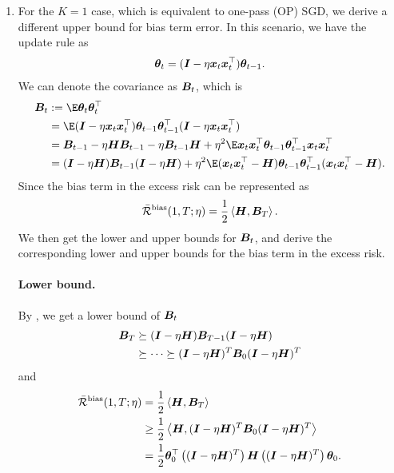 \begin{enumerate}[leftmargin=*]
    \item For the $K = 1$ case, which is equivalent to one-pass (OP) SGD, we derive a different upper bound for bias term error. In this scenario, we have the update rule as
        \begin{align*}
            {\bm{\theta}}_{t} = ({\bm{I}}-\eta{\bm{x}}_{t}{\bm{x}}_{t}^{\top}){\bm{\theta}}_{t-1}.
        \end{align*}
        We can denote the covariance as ${\bm{B}}_t$, which is
        \begin{align}
            \mB_t&:=\E\vtheta_{t}\vtheta_{t}^{\top} \notag\\
            &=\E(\mI-\eta\vx_{t}\vx_{t}^{\top})\vtheta_{t-1}\vtheta_{t-1}^{\top}(\mI-\eta\vx_{t}\vx_{t}^{\top}) \notag \\
            &=\mB_{t-1}-\eta\mH\mB_{t-1}-\eta\mB_{t-1}\mH+\eta^2\E\vx_{t}\vx_{t}^{\top}\vtheta_{t-1}\vtheta_{t-1}^{\top}\vx_{t}\vx_{t}^{\top} \notag \\
            &=(\mI-\eta\mH)\mB_{t-1}(\mI-\eta\mH)+\eta^2\E(\vx_{t}\vx_{t}^{\top}-\mH)\vtheta_{t-1}\vtheta_{t-1}^{\top}(\vx_{t}\vx_{t}^{\top}-\mH). \label{equ:recursion-B-t}
        \end{align}
        Since the bias term in the excess risk can be represented as
        \begin{align*}
            \bar{\mathcal{R}}^{\mathrm{bias}}(1,T;\eta)=\frac{1}{2}\left\langle {\bm{H}},{\bm{B}}_T\right\rangle.
        \end{align*}
        We then get the lower and upper bounds for ${\bm{B}}_t$, and derive the corresponding lower and upper bounds for the bias term in the excess risk.
        \paragraph{Lower bound.}
        
        By , we get a lower bound of ${\bm{B}}_t$
        \begin{align*}
            {\bm{B}}_T&\succeq({\bm{I}}-\eta{\bm{H}}){\bm{B}}_{T-1}({\bm{I}}-\eta{\bm{H}}) \\
            &\succeq \cdots \succeq({\bm{I}}-\eta{\bm{H}})^{T}{\bm{B}}_0({\bm{I}}-\eta{\bm{H}})^{T}
        \end{align*}
        and 
        \begin{align*}
            \bar{\mathcal{R}}^{\mathrm{bias}}(1,T;\eta)&=\frac{1}{2}\left\langle {\bm{H}},{\bm{B}}_T\right\rangle \\
            &\geq\frac{1}{2}\left\langle {\bm{H}},({\bm{I}}-\eta{\bm{H}})^{T}{\bm{B}}_0({\bm{I}}-\eta{\bm{H}})^{T}\right\rangle \\
            &=\frac{1}{2}{\bm{\theta}}_0^{\top}\left(({\bm{I}}-\eta{\bm{H}})^{T}\right){\bm{H}}\left(({\bm{I}}-\eta{\bm{H}})^{T}\right){\bm{\theta}}_0.
        \end{align*}

\end{enumerate}

